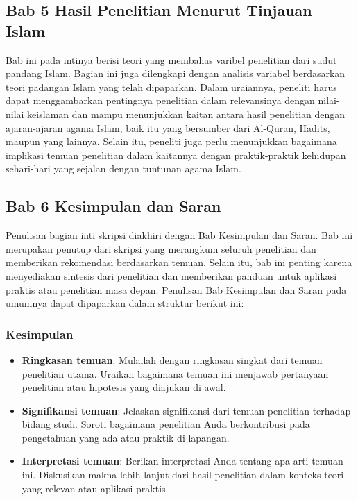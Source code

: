 \documentclass[
  indonesian,
  letterpaper,
]{scrbook}
\providecommand{\tightlist}{%
  \setlength{\itemsep}{0pt}\setlength{\parskip}{0pt}}
\begin{document}
\subsection{Bab 5 Hasil Penelitian Menurut Tinjauan
Islam}\label{bab-5-hasil-penelitian-menurut-tinjauan-islam}

Bab ini pada intinya berisi teori yang membahas varibel penelitian dari
sudut pandang Islam. Bagian ini juga dilengkapi dengan analisis variabel
berdasarkan teori padangan Islam yang telah dipaparkan. Dalam uraiannya,
peneliti harus dapat menggambarkan pentingnya penelitian dalam
relevansinya dengan nilai-nilai keislaman dan mampu menunjukkan kaitan
antara hasil penelitian dengan ajaran-ajaran agama Islam, baik itu yang
bersumber dari Al-Quran, Hadits, maupun yang lainnya. Selain itu,
peneliti juga perlu menunjukkan bagaimana implikasi temuan penelitian
dalam kaitannya dengan praktik-praktik kehidupan sehari-hari yang
sejalan dengan tuntunan agama Islam.

\subsection{Bab 6 Kesimpulan dan
Saran}\label{bab-6-kesimpulan-dan-saran}

Penulisan bagian inti skripsi diakhiri dengan Bab Kesimpulan dan Saran.
Bab ini merupakan penutup dari skripsi yang merangkum seluruh penelitian
dan memberikan rekomendasi berdasarkan temuan. Selain itu, bab ini
penting karena menyediakan sintesis dari penelitian dan memberikan
panduan untuk aplikasi praktis atau penelitian masa depan. Penulisan Bab
Kesimpulan dan Saran pada umumnya dapat dipaparkan dalam struktur
berikut ini:

\subsubsection{Kesimpulan}\label{kesimpulan-3}

\begin{itemize}
\tightlist
\item
  \textbf{Ringkasan temuan}: Mulailah dengan ringkasan singkat dari
  temuan penelitian utama. Uraikan bagaimana temuan ini menjawab
  pertanyaan penelitian atau hipotesis yang diajukan di awal.
\item
  \textbf{Signifikansi temuan}: Jelaskan signifikansi dari temuan
  penelitian terhadap bidang studi. Soroti bagaimana penelitian Anda
  berkontribusi pada pengetahuan yang ada atau praktik di lapangan.
\item
  \textbf{Interpretasi temuan}: Berikan interpretasi Anda tentang apa
  arti temuan ini. Diskusikan makna lebih lanjut dari hasil penelitian
  dalam konteks teori yang relevan atau aplikasi praktis.
\end{itemize}
\end{document}
